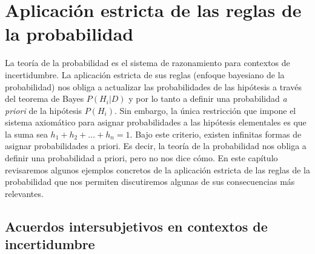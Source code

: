 \documentclass[a4paper,11pt]{book}
\theoremstyle{definition}
\begin{document}
\section{Aplicaci\'on estricta de las reglas de la probabilidad} \label{sec:aplicacion_estricta}


La teor\'ia de la probabilidad es el sistema de razonamiento para contextos de incertidumbre.
%
La aplicación estricta de sus reglas (enfoque bayesiano de la probabilidad) nos obliga a actualizar las probabilidades de las hipótesis a través del teorema de Bayes $P(H_i|D)$ y por lo tanto a definir una probabilidad \emph{a priori} de la hipótesis $P(H_i)$.
%
Sin embargo, la única restricción que impone el sistema axiomático para asignar probabilidades a las hipótesis elementales es que la suma sea $h_1 + h_2 + \dots + h_n = 1$.
%
Bajo este criterio, existen infinitas formas de asignar probabilidades a priori.
%
Es decir, la teor\'ia de la probabilidad nos obliga a definir una probabilidad a priori, pero no nos dice cómo.
%
En este cap\'itulo revisaremos algunos ejemplos concretos de la aplicación estricta de las reglas de la probabilidad que nos permiten discutiremos algunas de sus consecuencias más relevantes.

\subsection{Acuerdos intersubjetivos en contextos de incertidumbre} \label{sec:acuerdos_intersubjetivos}
\end{document}
